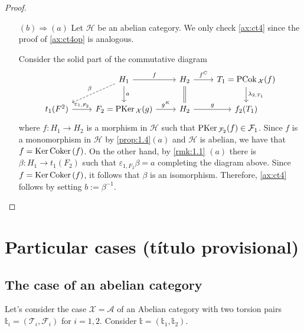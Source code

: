 \begin{proof}
\begin{enumerate}
    \item[$(b)\Rightarrow (a)$] Let $\mathcal{H}$ be an abelian category. We only check \ref{ax:ct4} 
    since the proof of \ref{ax:ct4op} is analogous.

    Consider the solid part of the commutative diagram
    \begin{equation*}
      \begin{tikzcd}
        & H_1\arrow{r}{f}\arrow{d}{a}\arrow[dashed]{dl}[']{\beta}
          & H_2\arrow{r}{f^C}\arrow[equal]{d}
            & T_1=\PCok_\mathcal{X}(f)\arrow{d}{\lambda_{2,T_1}}\\
        t_1(F^2)\arrow{r}{\varepsilon_{1,F_2}}
        & F_2=\PKer_\mathcal{X}(g)\arrow{r}{g^K}
          & H_2\arrow{r}{g}
            &f_2(T_1)
      \end{tikzcd}
    \end{equation*}
    where $f:H_1\to H_2$ is a morphism in $\mathcal{H}$ such that $\mathrm{\textup{PKer\,}}_{\mathcal{F}_2}(f)\in\mathcal{F}_1$.
    Since $f$ is a monomorphism in $\mathcal{H}$ by \ref{prop:1.4}$(a)$ 
    and $\mathcal{H}$ is abelian, we have that $f=\mathrm{\textup{Ker\,}} \mathrm{\textup{Coker\,}} (f)$. On the other hand, by
    \ref{rmk:1.1} $(a)$ there is $\beta:H_1\to t_1(F_2)$ such that $\varepsilon_{1,F_2}\beta = a$
    completing the diagram above. Since $f=\mathrm{\textup{Ker\,}} \mathrm{\textup{Coker\,}}(f)$, it follows that $\beta$ is
    an isomorphism. Therefore, \ref{ax:ct4} follows by setting $b:=\beta^{-1}$.
  \end{enumerate}
\end{proof}
















\section{Particular cases (t\'itulo provisional)}
\subsection{The case of an abelian category}

Let's consider the case $\mathcal{X}=\mathcal{A}$ of an Abelian category with
two torsion pairs $\mathbb{t}_i=(\mathcal{T}_i,\mathcal{F}_i)$ for $i=1,2$.
Consider $\mathbb{t}=(\mathbb{t}_1,\mathbb{t}_2)$.

